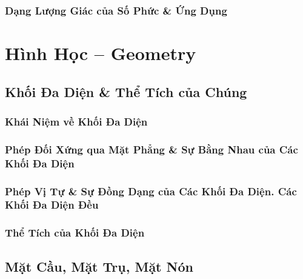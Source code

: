 \documentclass[oneside]{book}
\numberwithin{equation}{section}
\begin{document}

\section{Dạng Lượng Giác của Số Phức \& Ứng Dụng}


\part{Hình Học -- Geometry}

\chapter{Khối Đa Diện \& Thể Tích của Chúng}

\section{Khái Niệm về Khối Đa Diện}


\section{Phép Đối Xứng qua Mặt Phẳng \& Sự Bằng Nhau của Các Khối Đa Diện}


\section{Phép Vị Tự \& Sự Đồng Dạng của Các Khối Đa Diện. Các Khối Đa Diện Đều}


\section{Thể Tích của Khối Đa Diện}


\chapter{Mặt Cầu, Mặt Trụ, Mặt Nón}
\end{document}
